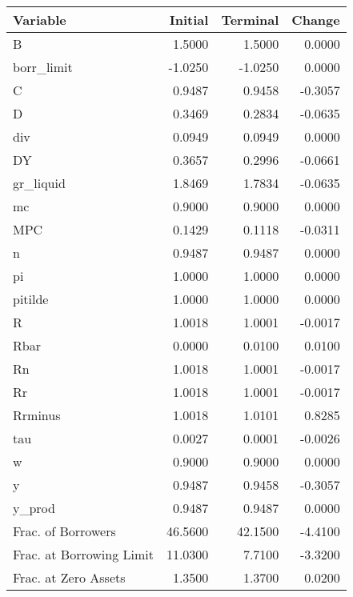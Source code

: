 \begin{table}
\centering
\label{tab:stst}
\begin{tabular}{lrrr}
\toprule
                Variable &  Initial &  Terminal &  Change \\
\midrule
                       B &   1.5000 &    1.5000 &  0.0000 \\
              borr\_limit &  -1.0250 &   -1.0250 &  0.0000 \\
                       C &   0.9487 &    0.9458 & -0.3057 \\
                       D &   0.3469 &    0.2834 & -0.0635 \\
                     div &   0.0949 &    0.0949 &  0.0000 \\
                      DY &   0.3657 &    0.2996 & -0.0661 \\
               gr\_liquid &   1.8469 &    1.7834 & -0.0635 \\
                      mc &   0.9000 &    0.9000 &  0.0000 \\
                     MPC &   0.1429 &    0.1118 & -0.0311 \\
                       n &   0.9487 &    0.9487 &  0.0000 \\
                      pi &   1.0000 &    1.0000 &  0.0000 \\
                 pitilde &   1.0000 &    1.0000 &  0.0000 \\
                       R &   1.0018 &    1.0001 & -0.0017 \\
                    Rbar &   0.0000 &    0.0100 &  0.0100 \\
                      Rn &   1.0018 &    1.0001 & -0.0017 \\
                      Rr &   1.0018 &    1.0001 & -0.0017 \\
                 Rrminus &   1.0018 &    1.0101 &  0.8285 \\
                     tau &   0.0027 &    0.0001 & -0.0026 \\
                       w &   0.9000 &    0.9000 &  0.0000 \\
                       y &   0.9487 &    0.9458 & -0.3057 \\
                  y\_prod &   0.9487 &    0.9487 &  0.0000 \\
      Frac. of Borrowers &  46.5600 &   42.1500 & -4.4100 \\
Frac. at Borrowing Limit &  11.0300 &    7.7100 & -3.3200 \\
    Frac. at Zero Assets &   1.3500 &    1.3700 &  0.0200 \\
\bottomrule
\end{tabular}
\end{table}
